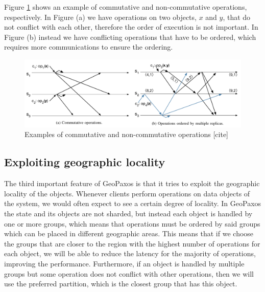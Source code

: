 Figure \ref{fig:partial-ordering} shows an example of commutative and non-commutative operations, respectively. In Figure (a) we have operations on two objects, $x$ and $y$, that do not conflict with each other, therefore the order of execution is not important. In Figure (b) instead we have conflicting operations that have to be ordered, which requires more communications to ensure the ordering.

\begin{figure}[htb]
  \centering
  \includegraphics[width=\textwidth,height=\textheight,keepaspectratio]{img/partial-ordering.png}

  \caption{ Examples of commutative and non-commutative operations [cite] }
  \label{fig:partial-ordering}
\end{figure}

\subsection{Exploiting geographic locality}
The third important feature of GeoPaxos is that it tries to exploit the geographic locality of the objects. Whenever clients perform operations on data objects of the system, we would often expect to see a certain degree of locality. In GeoPaxos the state and its objects are not sharded, but instead each object is handled by one or more groups, which means that operations must be ordered by said groups which can be placed in different geographic areas. This means that if we choose the groups that are closer to the region with the highest number of operations for each object, we will be able to reduce the latency for the majority of operations, improving the performance. Furthermore, if an object is handled by multiple groups but some operation does not conflict with other operations, then we will use the preferred partition, which is the closest group that has this object.